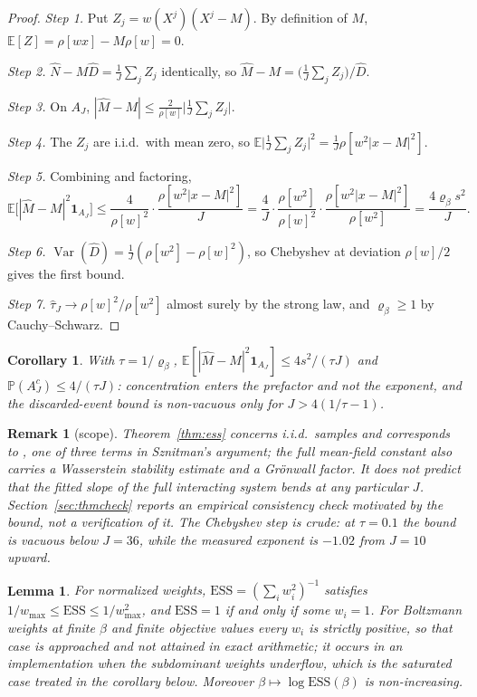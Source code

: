 \documentclass[pdflatex,sn-mathphys-num]{sn-jnl}
\theoremstyle{thmstyleone}
\newtheorem{lemma}[theorem]{Lemma}
\newtheorem{corollary}[theorem]{Corollary}
\theoremstyle{thmstyletwo}
\newtheorem{remark}{Remark}
\theoremstyle{thmstylethree}
\begin{document}
\begin{proof}
\emph{Step 1.} Put $Z_j=w(X^j)(X^j-M)$. By definition of $M$, $\mathbb E[Z]=\rho[wx]-M\rho[w]=0$.

\emph{Step 2.} $\hat N-M\hat D=\frac1J\sum_jZ_j$ identically, so $\hat M-M=\bigl(\frac1J\sum_jZ_j\bigr)/\hat D$.

\emph{Step 3.} On $A_J$, $|\hat M-M|\le\frac2{\rho[w]}\bigl|\frac1J\sum_jZ_j\bigr|$.

\emph{Step 4.} The $Z_j$ are i.i.d.\ with mean zero, so $\mathbb E\bigl|\frac1J\sum_jZ_j\bigr|^2=\frac1J\rho[w^2|x-M|^2]$.

\emph{Step 5.} Combining and factoring,
\[
\mathbb E\bigl[|\hat M-M|^2\mathbf1_{A_J}\bigr]\le\frac{4}{\rho[w]^2}\cdot\frac{\rho[w^2|x-M|^2]}{J}
=\frac4J\cdot\frac{\rho[w^2]}{\rho[w]^2}\cdot\frac{\rho[w^2|x-M|^2]}{\rho[w^2]}=\frac{4\varrho_\beta s^2}{J}.
\]

\emph{Step 6.} $\operatorname{Var}(\hat D)=\frac1J(\rho[w^2]-\rho[w]^2)$, so Chebyshev at deviation $\rho[w]/2$ gives the first bound.

\emph{Step 7.} $\hat\tau_J\to\rho[w]^2/\rho[w^2]$ almost surely by the strong law, and $\varrho_\beta\ge1$ by Cauchy--Schwarz.
\end{proof}

\begin{corollary}\label{cor:tauJ}
With $\tau=1/\varrho_\beta$, $\mathbb E[|\hat M-M|^2\mathbf1_{A_J}]\le4s^2/(\tau J)$ and $\mathbb P(A_J^c)\le4/(\tau J)$: concentration enters the prefactor and not the exponent, and the discarded-event bound is non-vacuous only for $J>4(1/\tau-1)$.
\end{corollary}

\begin{remark}[scope]\label{rem:thmscope}
Theorem~\ref{thm:ess} concerns i.i.d.\ samples and corresponds to \cite[Lemma 3.7]{ghv2025}, one of three terms in Sznitman's argument; the full mean-field constant also carries a Wasserstein stability estimate and a Gr\"onwall factor. It does not predict that the fitted slope of the full interacting system bends at any particular $J$. Section~\ref{sec:thmcheck} reports an empirical consistency check motivated by the bound, not a verification of it. The Chebyshev step is crude: at $\tau=0.1$ the bound is vacuous below $J=36$, while the measured exponent is $-1.02$ from $J=10$ upward.
\end{remark}

\begin{lemma}\label{lem:sat}
For normalized weights, $\mathrm{ESS}=(\sum_iw_i^2)^{-1}$ satisfies $1/w_{\max}\le\mathrm{ESS}\le1/w_{\max}^2$, and $\mathrm{ESS}=1$ if and only if some $w_i=1$. For Boltzmann weights at finite $\beta$ and finite objective values every $w_i$ is strictly positive, so that case is approached and not attained in exact arithmetic; it occurs in an implementation when the subdominant weights underflow, which is the saturated case treated in the corollary below. Moreover $\beta\mapsto\log\mathrm{ESS}(\beta)$ is non-increasing.
\end{lemma}
\end{document}
